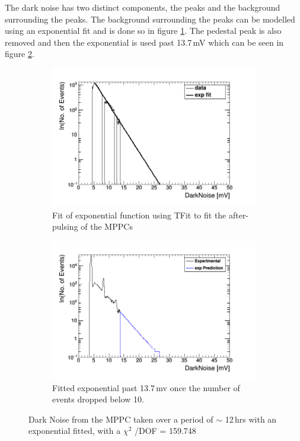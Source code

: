 The dark noise has two distinct components, the peaks and the background surrounding the peaks. The background surrounding the peaks can be modelled using an exponential fit and is done so in figure \ref{subFig:expFitOfDark}. The pedestal peak is also removed and then the exponential is used past 13.7\,mV which can be seen in figure \ref{subFig:fittedDarkNoise}. 
\begin{figure}[htbp]
\centering
\begin{subfigure}{.5\textwidth}
  \centering
  \includegraphics[width=\linewidth]{fit_of_dark_noise.png}
  \captionsetup{width=.9\linewidth}
  \caption{Fit of exponential function using TFit to fit the after-pulsing of the MPPCs}
  \label{subFig:expFitOfDark}
\end{subfigure}%
\begin{subfigure}{.5\textwidth}
  \centering
  \includegraphics[width=\linewidth]{fittedDarkNoise_output.png}
  \captionsetup{width=.9\linewidth}
  \caption{Fitted exponential past 13.7\,mv once the number of events dropped below 10.}
  \label{subFig:fittedDarkNoise}
\end{subfigure}
\caption{Dark Noise from the MPPC taken over a period of $\sim$ 12\,hrs with an exponential fitted, with a $\chi ^2$ /DOF = 159.748}
\label{fig:fitting_of_non_peak_dark_noise}
\end{figure}

